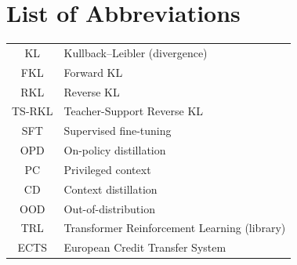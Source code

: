 \chapter{List of Abbreviations}
        \begin{table}[h]
                \centering
                \begin{tabular}{cl}
                                KL      & Kullback--Leibler (divergence) \\
                                FKL     & Forward KL \\
                                RKL     & Reverse KL \\
                                TS-RKL  & Teacher-Support Reverse KL \\
                                SFT     & Supervised fine-tuning \\
                                OPD     & On-policy distillation \\
                                PC      & Privileged context \\
                                CD      & Context distillation \\
                                OOD     & Out-of-distribution \\
                                TRL     & Transformer Reinforcement Learning (library) \\
                                ECTS    & European Credit Transfer System
                \end{tabular}
        \end{table}
